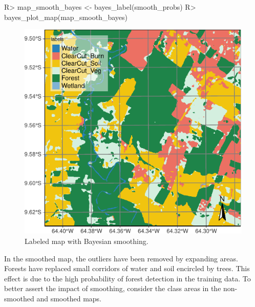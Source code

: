\documentclass[
  shortnames]{jss}
\begin{document}
\begin{CodeChunk}
\begin{CodeInput}
R> map_smooth_bayes <- bayes_label(smooth_probs)
R> bayes_plot_map(map_smooth_bayes)
\end{CodeInput}
\begin{figure}[h]

{\centering \includegraphics{Bayesian_smoothing_JSS_files/figure-latex/smth1-1} 

}

\caption[Labeled map with Bayesian  smoothing]{Labeled map with Bayesian  smoothing.}\label{fig:smth1}
\end{figure}
\end{CodeChunk}

In the smoothed map, the outliers have been removed by expanding  areas. Forests have replaced small corridors of water and soil encircled by trees. This effect is due to the high probability of forest detection in the training data. To better assert the impact of smoothing, consider the class areas in the non-smoothed and smoothed maps.
\end{document}
